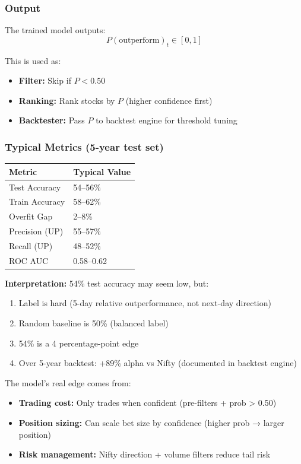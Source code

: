 \documentclass[11pt,a4paper]{article}
\begin{document}
\subsubsection{Output}

The trained model outputs:
\begin{equation}
P(\text{outperform})_t \in [0, 1]
\end{equation}

This is used as:
\begin{itemize}
    \item \textbf{Filter:} Skip if $P < 0.50$
    \item \textbf{Ranking:} Rank stocks by $P$ (higher confidence first)
    \item \textbf{Backtester:} Pass $P$ to backtest engine for threshold tuning
\end{itemize}

\subsubsection{Typical Metrics (5-year test set)}

\begin{table}[h]
\centering
\begin{tabular}{ll}
\toprule
\textbf{Metric} & \textbf{Typical Value} \\
\midrule
Test Accuracy & 54–56\% \\
Train Accuracy & 58–62\% \\
Overfit Gap & 2–8\% \\
Precision (UP) & 55–57\% \\
Recall (UP) & 48–52\% \\
ROC AUC & 0.58–0.62 \\
\bottomrule
\end{tabular}
\end{table}

\textbf{Interpretation:} 54\% test accuracy may seem low, but:
\begin{enumerate}
    \item Label is hard (5-day relative outperformance, not next-day direction)
    \item Random baseline is 50\% (balanced label)
    \item 54\% is a 4 percentage-point edge
    \item Over 5-year backtest: +89\% alpha vs Nifty (documented in backtest engine)
\end{enumerate}

The model's real edge comes from:
\begin{itemize}
    \item \textbf{Trading cost:} Only trades when confident (pre-filters + prob > 0.50)
    \item \textbf{Position sizing:} Can scale bet size by confidence (higher prob → larger position)
    \item \textbf{Risk management:} Nifty direction + volume filters reduce tail risk
\end{itemize}
\end{document}
